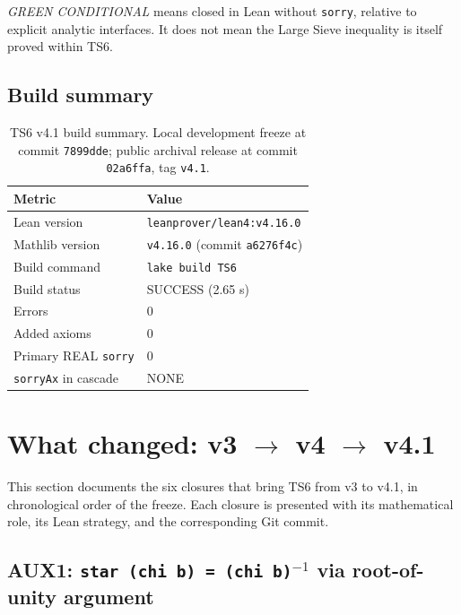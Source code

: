 \documentclass[11pt,a4paper]{article}
\theoremstyle{definition}
\begin{document}
\medskip
\noindent\emph{GREEN CONDITIONAL} means closed in Lean without \texttt{sorry}, relative to explicit analytic interfaces. It does not mean the Large Sieve inequality is itself proved within TS6.

\subsection{Build summary}

\begin{table}[H]
\centering
\renewcommand{\arraystretch}{1.2}
\begin{tabular}{@{}ll@{}}
\toprule
\textbf{Metric} & \textbf{Value} \\
\midrule
Lean version & \texttt{leanprover/lean4:v4.16.0} \\
Mathlib version & \texttt{v4.16.0} (commit \texttt{a6276f4c}) \\
Build command & \texttt{lake build TS6} \\
Build status & SUCCESS (2.65 s) \\
Errors & 0 \\
Added axioms & 0 \\
Primary REAL \texttt{sorry} & 0 \\
\verb|sorryAx| in cascade & NONE \\
\bottomrule
\end{tabular}
\caption{TS6 v4.1 build summary. Local development freeze at commit \texttt{7899dde}; public archival release at commit \texttt{02a6ffa}, tag \texttt{v4.1}.}\label{tab:build-v41}
\end{table}

\section{What changed: v3 \texorpdfstring{$\to$}{->} v4 \texorpdfstring{$\to$}{->} v4.1}\label{sec:changed}

This section documents the six closures that bring TS6 from v3 to v4.1, in chronological order of the freeze. Each closure is presented with its mathematical role, its Lean strategy, and the corresponding Git commit.

\subsection{AUX1: \texttt{star (chi b) = (chi b)\(^{-1}\)} via root-of-unity argument}
\end{document}
